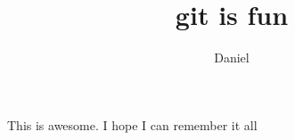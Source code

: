 \documentclass[10pt]{article}
\author{Daniel}
\title{git is fun}
\begin{document}
	\maketitle

	This is awesome. I hope I can remember it all
\end{document}
